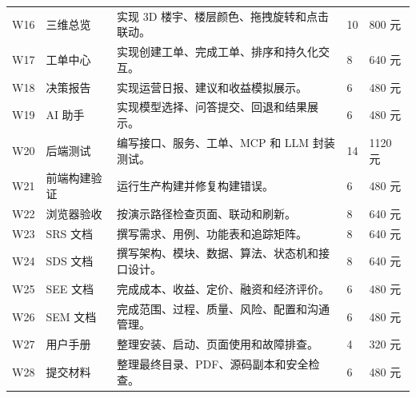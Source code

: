 \documentclass[12pt,a4paper]{ctexart}
\begin{document}
\begin{longtable}{L{1.5cm}L{3.2cm}L{5.8cm}L{1.6cm}L{2.4cm}}
W16 & 三维总览 & 实现 3D 楼宇、楼层颜色、拖拽旋转和点击联动。 & 10 & 800 元 \\
W17 & 工单中心 & 实现创建工单、完成工单、排序和持久化交互。 & 8 & 640 元 \\
W18 & 决策报告 & 实现运营日报、建议和收益模拟展示。 & 6 & 480 元 \\
W19 & AI 助手 & 实现模型选择、问答提交、回退和结果展示。 & 6 & 480 元 \\
W20 & 后端测试 & 编写接口、服务、工单、MCP 和 LLM 封装测试。 & 14 & 1120 元 \\
W21 & 前端构建验证 & 运行生产构建并修复构建错误。 & 6 & 480 元 \\
W22 & 浏览器验收 & 按演示路径检查页面、联动和刷新。 & 8 & 640 元 \\
W23 & SRS 文档 & 撰写需求、用例、功能表和追踪矩阵。 & 8 & 640 元 \\
W24 & SDS 文档 & 撰写架构、模块、数据、算法、状态机和接口设计。 & 8 & 640 元 \\
W25 & SEE 文档 & 完成成本、收益、定价、融资和经济评价。 & 6 & 480 元 \\
W26 & SEM 文档 & 完成范围、过程、质量、风险、配置和沟通管理。 & 6 & 480 元 \\
W27 & 用户手册 & 整理安装、启动、页面使用和故障排查。 & 4 & 320 元 \\
W28 & 提交材料 & 整理最终目录、PDF、源码副本和安全检查。 & 6 & 480 元 \\
\bottomrule
\end{longtable}
\end{document}
